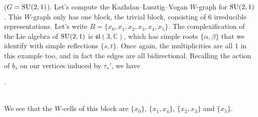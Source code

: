 \noindent\begin{example}\textup{($G = \textup{SU}(2, 1)$).} Let's compute the Kazhdan--Lusztig--Vogan $W$-graph for $\textup{SU}(2, 1)$. This $W$-graph only has one block, the trivial block, consisting of $6$ irreducible representations. Let's write $B = \{x_0, x_1, x_2, x_3, x_4, x_5\}$. The complexification of the Lie algebra of $\textup{SU}(2, 1)$ is $\mathfrak{sl}(3, \mathbb{C})$, which has simple roots $\{\alpha, \beta\}$ that we identify with simple reflections $\{s, t\}$. Once again, the multiplicities are all $1$ in this example too, and in fact the edges are all bidirectional. Recalling the action of $b_s$ on our vertices induced by $\tau_s'$, we have\\[-3\linespacing]
\begin{center}
.
\end{center}
\noindent\\[-3.5\linespacing] We see that the $W$-cells of this block are $\{x_0\}$, $\{x_1, x_4\}$, $\{x_2, x_3\}$ and $\{x_5\}$.
\end{example}

\newpage
\renewcommand\thesection{R}
\begingroup
\setlength{\emergencystretch}{.5em}
\printbibliography[heading=none]
\endgroup

